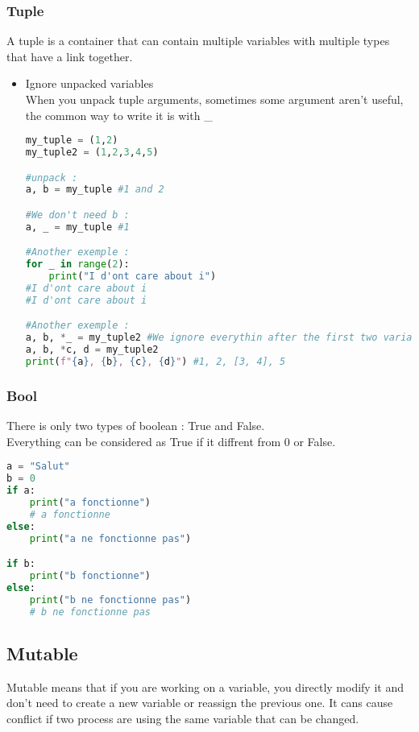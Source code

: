 \documentclass[a4paper, 12pt]{article}
\begin{document}
\subsubsection{Tuple}
A tuple is a container that can contain multiple variables with multiple types that have a link together. \\
\begin{itemize}
\item Ignore unpacked variables \\
When you unpack tuple arguments, sometimes some argument aren't useful, the common way to write it is with \_
\begin{lstlisting}[language=Python]
my_tuple = (1,2)
my_tuple2 = (1,2,3,4,5)

#unpack :
a, b = my_tuple #1 and 2

#We don't need b :
a, _ = my_tuple #1

#Another exemple :
for _ in range(2):
	print("I d'ont care about i")
#I d'ont care about i
#I d'ont care about i

#Another exemple :
a, b, *_ = my_tuple2 #We ignore everythin after the first two variables, the rest is stored in a list.
a, b, *c, d = my_tuple2 
print(f"{a}, {b}, {c}, {d}") #1, 2, [3, 4], 5
\end{lstlisting}
\end{itemize}


\subsubsection{Bool}
\label{subsec:Bool}
There is only two types of boolean : True and False. \\
Everything can be considered as True if it diffrent from 0 or False. \\
\begin{lstlisting}[language=Python]
a = "Salut"
b = 0
if a:
	print("a fonctionne")
	# a fonctionne
else:
	print("a ne fonctionne pas")

if b:
	print("b fonctionne")
else:
	print("b ne fonctionne pas")
	# b ne fonctionne pas
\end{lstlisting}

\subsection{Mutable}
Mutable means that if you are working on a variable, you directly modify it and don't need to create a new variable or reassign the previous one. It cans cause conflict if two process are using the same variable that can be changed.\newline
\end{document}

